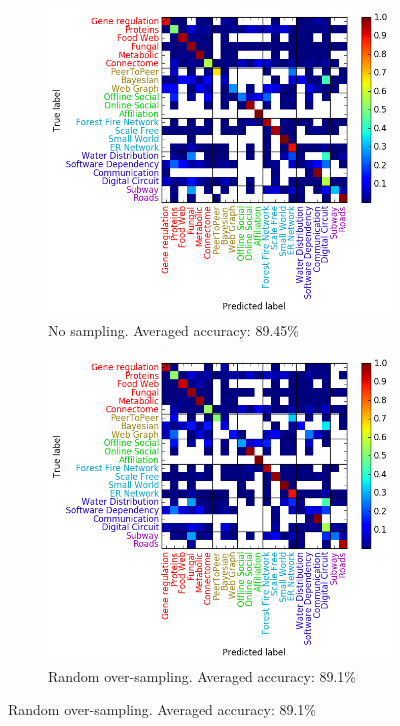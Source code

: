 \documentclass{article}
\begin{document}
\begin{figure}[H]
	\begin{subfigure}{0.48\textwidth}
	\includegraphics[width=\linewidth]{figs/similarity/SubDomain/None/confusion_sub_None.png}
	\caption{No sampling. Averaged accuracy: 89.45\%} \label{no_confusion_sub}
	\end{subfigure}\hspace*{\fill}
	\begin{subfigure}{0.48\textwidth}
	\includegraphics[width=\linewidth]{figs/similarity/SubDomain/RandomOver/confusion_sub_RandomOver.png}
	\caption{Random over-sampling. Averaged accuracy: 89.1\%} \label{random_over_confusion_sub}
	\end{subfigure}
	

\end{figure}
\end{document}
